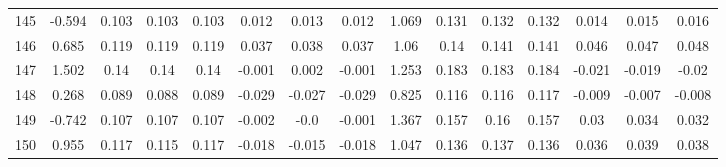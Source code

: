 \begin{table}[H]
{\begin{tabular}{l|c|ccc|ccc|c|ccc|ccc}
			145 & -0.594 & 0.103 & 0.103 & 0.103 & 0.012 & 0.013 & 0.012 & 1.069 & 0.131 & 0.132 & 0.132 & 0.014 & 0.015 & 0.016 \\
			146 & 0.685 & 0.119 & 0.119 & 0.119 & 0.037 & 0.038 & 0.037 & 1.06 & 0.14 & 0.141 & 0.141 & 0.046 & 0.047 & 0.048 \\
			147 & 1.502 & 0.14 & 0.14 & 0.14 & -0.001 & 0.002 & -0.001 & 1.253 & 0.183 & 0.183 & 0.184 & -0.021 & -0.019 & -0.02 \\
			148 & 0.268 & 0.089 & 0.088 & 0.089 & -0.029 & -0.027 & -0.029 & 0.825 & 0.116 & 0.116 & 0.117 & -0.009 & -0.007 & -0.008 \\
			149 & -0.742 & 0.107 & 0.107 & 0.107 & -0.002 & -0.0 & -0.001 & 1.367 & 0.157 & 0.16 & 0.157 & 0.03 & 0.034 & 0.032 \\
			150 & 0.955 & 0.117 & 0.115 & 0.117 & -0.018 & -0.015 & -0.018 & 1.047 & 0.136 & 0.137 & 0.136 & 0.036 & 0.039 & 0.038 \\
	\end{tabular}}
\end{table}
\pagebreak

